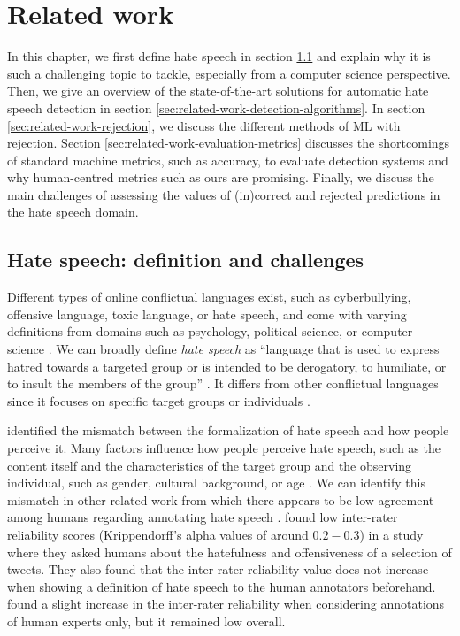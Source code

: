 \chapter{Related work}
\label{sec:related-work}
In this chapter, we first define hate speech in section \ref{sec:related-work-challenges} and explain why it is such a challenging topic to tackle, especially from a computer science perspective.
%
Then, we give an overview of the state-of-the-art solutions for automatic hate speech detection in section \ref{sec:related-work-detection-algorithms}.
%
In section \ref{sec:related-work-rejection}, we discuss the different methods of ML with rejection.
%
Section \ref{sec:related-work-evaluation-metrics} discusses the shortcomings of standard machine metrics, such as accuracy, to evaluate detection systems and why human-centred metrics such as ours are promising.
%
Finally, we discuss the main challenges of assessing the values of (in)correct and rejected predictions in the hate speech domain.
%

\section{Hate speech: definition and challenges}
\label{sec:related-work-challenges}
Different types of online conflictual languages exist, such as cyberbullying, offensive language, toxic language, or hate speech, and come with varying definitions from domains such as psychology, political science, or computer science \citep{balayn2021automatic}.
%
We can broadly define \textit{hate speech} as ``language that is used to express hatred towards a targeted group or is intended to be derogatory, to humiliate, or to insult the members of the group'' \citep{davidson2017automated, balayn2021automatic}.
%
It differs from other conflictual languages since it focuses on specific target groups or individuals \citep{balayn2021automatic}.
%
%

%
\citet{balayn2021automatic} identified the mismatch between the formalization of hate speech and how people perceive it.
%
Many factors influence how people perceive hate speech, such as the content itself and the characteristics of the target group and the observing individual, such as gender, cultural background, or age \citep{balayn2021automatic}.
%
We can identify this mismatch in other related work from which there appears to be low agreement among humans regarding annotating hate speech \citep{fortuna2018survey, ross2017measuring, waseem2016you}.
%
\citet{ross2017measuring} found low inter-rater reliability scores (Krippendorff's alpha values of around $0.2-0.3$) in a study where they asked humans about the hatefulness and offensiveness of a selection of tweets.
%
They also found that the inter-rater reliability value does not increase when showing a definition of hate speech to the human annotators beforehand.
%
\citet{waseem2016you} found a slight increase in the inter-rater reliability when considering annotations of human experts only, but it remained low overall.
%
%

